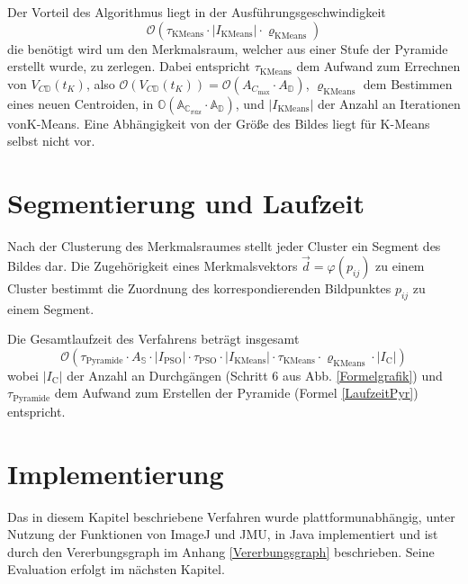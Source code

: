   Der Vorteil des Algorithmus liegt in der Ausführungsgeschwindigkeit
  \begin{equation}
    \mathcal O(\tau_\textrm{KMeans} \cdot |I_\textrm{KMeans}| \cdot \varrho_\textrm{KMeans})
  \end{equation}  
  die benötigt wird um den Merkmalsraum, welcher aus einer Stufe der Pyramide erstellt wurde, zu zerlegen.  
  Dabei entspricht $\tau_\textrm{KMeans}$ dem Aufwand zum Errechnen von $V_{C\mathbb{D}}(t_K)$, also $\mathcal O(V_{C\mathbb{D}}(t_K)) = \mathcal O(A_{C_\textrm{max}}\cdot A_\mathbb{D})$, $\varrho_\textrm{KMeans}$ dem Bestimmen eines neuen Centroiden, in $\mathbb{O(A_{C_\textrm{max}}\cdot A_\mathbb{D})}$, und $|I_\textrm{KMeans}|$ der Anzahl an Iterationen von\linebreak K-Means. Eine Abhängigkeit von der Größe des Bildes liegt für K-Means selbst nicht vor. \cite{Omran2006}

\section{Segmentierung und Laufzeit}
  Nach der Clusterung des Merkmalsraumes stellt jeder Cluster ein Segment des Bildes dar. Die Zugehörigkeit eines Merkmalsvektors $\vec{d}=\varphi(p_{ij})$ zu einem Cluster bestimmt die Zuordnung des korrespondierenden Bildpunktes $p_{ij}$ zu einem Segment.

  Die Gesamtlaufzeit des Verfahrens beträgt insgesamt
  \begin{displaymath}
    \mathcal O(\tau_\textrm{Pyramide} \cdot A_\mathbb{S} \cdot |I_\textrm{PSO}| \cdot \tau_\textrm{PSO} \cdot |I_\textrm{KMeans}| \cdot \tau_\textrm{KMeans} \cdot \varrho_\textrm{KMeans} \cdot |I_\textrm{C}|)
  \end{displaymath}
  wobei $|I_\textrm{C}|$ der Anzahl an Durchgängen (Schritt 6 aus Abb. \ref{Formelgrafik}) und $\tau_\textrm{Pyramide}$ dem Aufwand zum Erstellen der Pyramide (Formel \ref{LaufzeitPyr}) entspricht.


\section{Implementierung}
  Das in diesem Kapitel beschriebene Verfahren wurde plattformunabhängig, unter Nutzung der Funktionen von ImageJ und JMU, in Java implementiert und ist durch den Vererbungsgraph im Anhang \ref{Vererbungsgraph} beschrieben. Seine Evaluation erfolgt im nächsten Kapitel.

